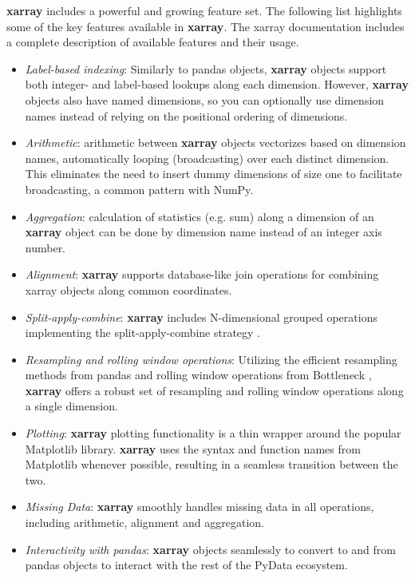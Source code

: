 \documentclass{jors}
\begin{document}
\textbf{xarray} includes a powerful and growing feature set.
The following list highlights some of the key features available in \textbf{xarray}.
The xarray documentation \citep{xarray_docs} includes a complete description of available features and their usage.

\begin{itemize}
	\item \textit{Label-based indexing}: Similarly to pandas objects, \textbf{xarray} objects support both integer- and label-based lookups along each dimension.
	However, \textbf{xarray} objects also have named dimensions, so you can optionally use dimension names instead of relying on the positional ordering of dimensions.
	\item \textit{Arithmetic}: arithmetic between \textbf{xarray} objects vectorizes based on dimension names, automatically looping (broadcasting) over each distinct dimension. This eliminates the need to insert dummy dimensions of size one to facilitate broadcasting, a common pattern with NumPy.
	\item \textit{Aggregation}: calculation of statistics (e.g. sum) along a dimension of an \textbf{xarray} object can be done by dimension name instead of an integer axis number.
	\item \textit{Alignment}: \textbf{xarray} supports database-like join operations for combining xarray objects along common coordinates.
	\item \textit{Split-apply-combine}: \textbf{xarray} includes N-dimensional grouped operations implementing the split-apply-combine strategy \citep{wickham_2011}.
	\item \textit{Resampling and rolling window operations}: Utilizing the efficient resampling methods from pandas and rolling window operations from Bottleneck \citep{Bottleneck}, \textbf{xarray} offers a robust set of resampling and rolling window operations along a single dimension.
	\item \textit{Plotting}: \textbf{xarray} plotting functionality is a thin wrapper around the popular Matplotlib library.
	\textbf{xarray} uses the syntax and function names from Matplotlib whenever possible, resulting in a seamless transition between the two.
	\item \textit{Missing Data}: \textbf{xarray} smoothly handles missing data in all operations, including arithmetic, alignment and aggregation.
	\item \textit{Interactivity with pandas}: \textbf{xarray} objects seamlessly to convert to and from pandas objects to interact with the rest of the PyData ecosystem.

\end{itemize}
\end{document}
